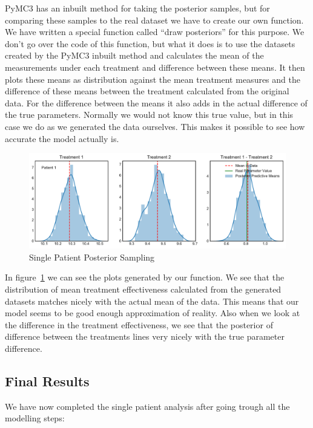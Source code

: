 \documentclass[12pt,a4paper,leqno]{report}
\theoremstyle{plain}
\theoremstyle{definition}
\theoremstyle{remark}
\begin{document}
PyMC3 has an inbuilt method for taking the posterior samples, but for comparing these
samples to the real dataset we have to create our own function. We have written a special function
called ``draw posteriors'' for this purpose. We don't go over the code of this function,
but what it does is to use the datasets created by the PyMC3 inbuilt method and
calculates the mean of the measurements under each treatment and difference between
these means. It then plots these means as distribution against the mean treatment
measures and the difference of these means between the treatment calculated from the
original data. For the difference between the means it also adds in the actual
difference of the true parameters. Normally we would not know
this true value, but in this case we do as we generated the data ourselves. This
makes it possible to see how accurate the model actually is.

\bigskip
\begin{figure}[H]
    \caption{Single Patient Posterior Sampling}
    \label{singlepatientposteriorsampling}
    \bigskip
    \includegraphics[width=\textwidth,height=\textheight,keepaspectratio]{single_patient_posterior_sampling.pdf}
\end{figure}
\bigskip

In figure\ \ref{singlepatientposteriorsampling} we can see the plots generated by our function.
We see that the distribution of mean treatment effectiveness calculated from the
generated datasets matches nicely with the actual mean of the data. This means that our
model seems to be good enough approximation of reality. Also when we look at the difference in the treatment effectiveness,
we see that the posterior of difference between the treatments lines very nicely with the
true parameter difference.

\subsection{Final Results}

We have now completed the single patient analysis after going trough all the modelling steps:
\end{document}
